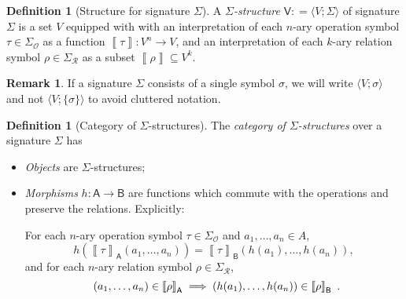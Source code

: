 \documentclass[11pt, a4paper, twoside,leqno]{amsart}
\newcommand{\dbr}[1]{\left\llbracket{#1}\right\rrbracket}
\newcommand{\defeq}{\mathrel{\mathop:}=}
\renewcommand{\O}{{\mathcal O}}
\newcommand{\R}{{\mathcal R}}
\numberwithin{equation}{section}
\theoremstyle{plain}
\theoremstyle{definition}
\newtheorem{Defn}[Thm]{Definition}
\newtheorem{Rk}[Thm]{Remark}
\begin{document}
\begin{Defn}[Structure for signature \(\Sigma\)]
  \label{def:sig-str}
  A \emph{\(\Sigma\)-structure} \(\mathsf{V} \defeq \langle V; \Sigma
  \rangle\) of signature \(\Sigma\) is a set \(V\) equipped with with an interpretation of each
  \(n\)-ary operation symbol \(\tau \in \Sigma_{\O}\) as a function \(\dbr{\tau}
  \colon V^{n} \rightarrow V\),
  and an interpretation of each \(k\)-ary relation symbol \(\rho \in \Sigma_{\R}\) as a
  subset \(\dbr{\rho} \subseteq V^{k}\).
\end{Defn}

\begin{Rk}
  \label{rk:sig-single-symbol}
  If a signature \(\Sigma\) consists of a single symbol \(\sigma\), we
  will write \(\langle V; \sigma \rangle\) and not \(\langle V;
  \{\sigma\} \rangle\) to avoid cluttered notation.
\end{Rk}

\begin{Defn}[Category of \(\Sigma\)-structures]
  \label{def:cat-sig-st}
  The \emph{category of \(\Sigma\)-structures} over a signature
  \(\Sigma\) has
  \begin{itemize}
  \item \emph{Objects} are \(\Sigma\)-structures;
  \item \emph{Morphisms} \(h \colon \mathsf{A} \rightarrow \mathsf{B}\) are
    functions which commute with the operations and preserve the
    relations. Explicitly:
    
    For each \(n\)-ary operation symbol \(\tau
    \in \Sigma_{\O }\) and \(a_{1},\dots, a_{n}\in A\), 
    \begin{equation*}
      h(\dbr{\tau}_{\mathsf{A}}(a_{1},\dotsc,a_{n})) = \dbr{\tau}_{\mathsf{B}} (h(a_{1}),\dotsc , h(a_{n})),
    \end{equation*}
    and for each \(n\)-ary relation symbol \(\rho \in \Sigma_{\R}\),
    \begin{equation*}
      (a_{1},\dotsc, a_{n}) \in \dbr{\rho}_{\mathsf{A}} \implies \left(h (a_{1}), \dotsc ,h(a_{n})\right) \in \dbr{\rho}_{\mathsf{B}} \rlap{ .}
    \end{equation*}
  \end{itemize}
\end{Defn}
\end{document}
